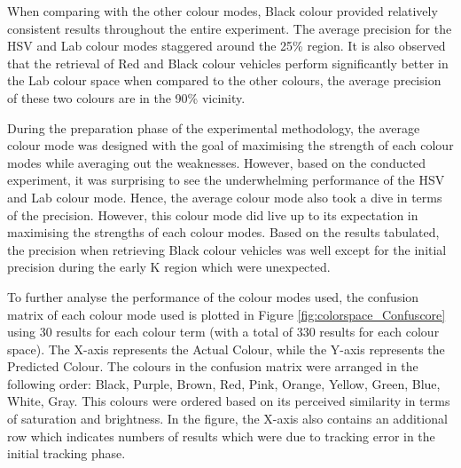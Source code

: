 When comparing with the other colour modes, Black colour provided relatively
consistent results throughout the entire experiment. The average precision for
the HSV and Lab colour modes staggered around the 25\% region. It is also
observed that the retrieval of Red and Black colour vehicles perform
significantly better in the Lab colour space when compared to the other colours,
the average precision of these two colours are in the 90\% vicinity.

During the preparation phase of the experimental methodology, the average
colour mode was designed with the goal of maximising the strength of each
colour modes while averaging out the weaknesses. However, based on the
conducted experiment, it was surprising to see the underwhelming performance of
the HSV and Lab colour mode. Hence, the average colour mode also took a dive in
terms of the precision. However, this colour mode did live up to its expectation
in maximising the strengths of each colour modes. Based on the results
tabulated, the precision when retrieving Black colour vehicles was well except
for the initial precision during the early K region which were unexpected.

To further analyse the performance of the colour modes used, the confusion
matrix of each colour mode used is plotted in Figure
\ref{fig:colorspace_Confuscore} using 30 results for each colour term (with a
total of 330 results for each colour space). The X-axis represents the Actual
Colour, while the Y-axis represents the Predicted Colour. The colours in the
confusion matrix were arranged in the following order: Black, Purple, Brown,
Red, Pink, Orange, Yellow, Green, Blue, White, Gray. This colours were ordered
based on its perceived similarity in terms of saturation and brightness.
In the figure, the X-axis also contains an additional row which indicates
numbers of results which were due to tracking error in the initial tracking
phase.

